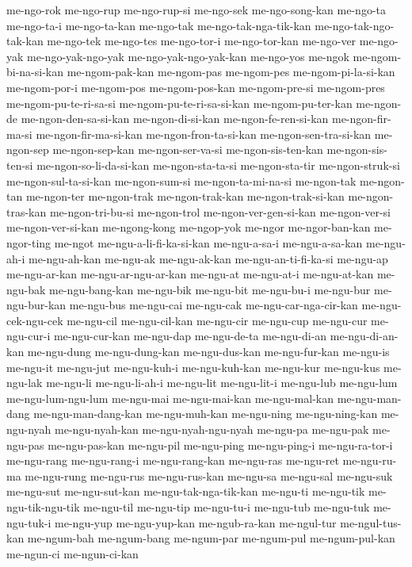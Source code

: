 {me-ngo-rok me-ngo-rup me-ngo-rup-si me-ngo-sek me-ngo-song-kan me-ngo-ta
me-ngo-ta-i me-ngo-ta-kan me-ngo-tak me-ngo-tak-nga-tik-kan
me-ngo-tak-ngo-tak-kan me-ngo-tek me-ngo-tes me-ngo-tor-i me-ngo-tor-kan
me-ngo-ver me-ngo-yak me-ngo-yak-ngo-yak me-ngo-yak-ngo-yak-kan me-ngo-yos
me-ngok me-ngom-bi-na-si-kan me-ngom-pak-kan me-ngom-pas me-ngom-pes
me-ngom-pi-la-si-kan me-ngom-por-i me-ngom-pos me-ngom-pos-kan
me-ngom-pre-si me-ngom-pres me-ngom-pu-te-ri-sa-si
me-ngom-pu-te-ri-sa-si-kan me-ngom-pu-ter-kan me-ngon-de
me-ngon-den-sa-si-kan me-ngon-di-si-kan me-ngon-fe-ren-si-kan
me-ngon-fir-ma-si me-ngon-fir-ma-si-kan me-ngon-fron-ta-si-kan
me-ngon-sen-tra-si-kan me-ngon-sep me-ngon-sep-kan me-ngon-ser-va-si
me-ngon-sis-ten-kan me-ngon-sis-ten-si me-ngon-so-li-da-si-kan
me-ngon-sta-ta-si me-ngon-sta-tir me-ngon-struk-si me-ngon-sul-ta-si-kan
me-ngon-sum-si me-ngon-ta-mi-na-si me-ngon-tak me-ngon-tan me-ngon-ter
me-ngon-trak me-ngon-trak-kan me-ngon-trak-si-kan me-ngon-tras-kan
me-ngon-tri-bu-si me-ngon-trol me-ngon-ver-gen-si-kan me-ngon-ver-si
me-ngon-ver-si-kan me-ngong-kong me-ngop-yok me-ngor me-ngor-ban-kan
me-ngor-ting me-ngot me-ngu-a-li-fi-ka-si-kan me-ngu-a-sa-i
me-ngu-a-sa-kan me-ngu-ah-i me-ngu-ah-kan me-ngu-ak me-ngu-ak-kan
me-ngu-an-ti-fi-ka-si me-ngu-ap me-ngu-ar-kan me-ngu-ar-ngu-ar-kan
me-ngu-at me-ngu-at-i me-ngu-at-kan me-ngu-bak me-ngu-bang-kan me-ngu-bik
me-ngu-bit me-ngu-bu-i me-ngu-bur me-ngu-bur-kan me-ngu-bus me-ngu-cai
me-ngu-cak me-ngu-car-nga-cir-kan me-ngu-cek-ngu-cek me-ngu-cil
me-ngu-cil-kan me-ngu-cir me-ngu-cup me-ngu-cur me-ngu-cur-i
me-ngu-cur-kan me-ngu-dap me-ngu-de-ta me-ngu-di-an me-ngu-di-an-kan
me-ngu-dung me-ngu-dung-kan me-ngu-dus-kan me-ngu-fur-kan me-ngu-is
me-ngu-it me-ngu-jut me-ngu-kuh-i me-ngu-kuh-kan me-ngu-kur me-ngu-kus
me-ngu-lak me-ngu-li me-ngu-li-ah-i me-ngu-lit me-ngu-lit-i me-ngu-lub
me-ngu-lum me-ngu-lum-ngu-lum me-ngu-mai me-ngu-mai-kan me-ngu-mal-kan
me-ngu-man-dang me-ngu-man-dang-kan me-ngu-muh-kan me-ngu-ning
me-ngu-ning-kan me-ngu-nyah me-ngu-nyah-kan me-ngu-nyah-ngu-nyah me-ngu-pa
me-ngu-pak me-ngu-pas me-ngu-pas-kan me-ngu-pil me-ngu-ping me-ngu-ping-i
me-ngu-ra-tor-i me-ngu-rang me-ngu-rang-i me-ngu-rang-kan me-ngu-ras
me-ngu-ret me-ngu-ru-ma me-ngu-rung me-ngu-rus me-ngu-rus-kan me-ngu-sa
me-ngu-sal me-ngu-suk me-ngu-sut me-ngu-sut-kan me-ngu-tak-nga-tik-kan
me-ngu-ti me-ngu-tik me-ngu-tik-ngu-tik me-ngu-til me-ngu-tip me-ngu-tu-i
me-ngu-tub me-ngu-tuk me-ngu-tuk-i me-ngu-yup me-ngu-yup-kan
me-ngub-ra-kan me-ngul-tur me-ngul-tus-kan me-ngum-bah me-ngum-bang
me-ngum-par me-ngum-pul me-ngum-pul-kan me-ngun-ci me-ngun-ci-kan
}
